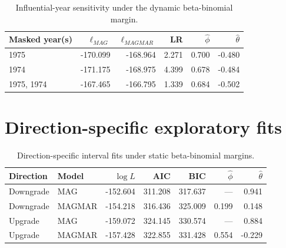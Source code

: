 \documentclass[11pt]{article}
\theoremstyle{definition}
\begin{document}
\begin{table}[H]
\centering
\caption{Influential-year sensitivity under the dynamic beta-binomial margin.}
\label{tab:influence}
\begin{tabular}{lrrrrr}
\toprule
Masked year(s) & $\ell_{MAG}$ & $\ell_{MAGMAR}$ & LR & $\widehat\phi$ & $\widehat\theta$ \\
\midrule
1975 & -170.099 & -168.964 & 2.271 & 0.700 & -0.480 \\
1974 & -171.175 & -168.975 & 4.399 & 0.678 & -0.484 \\
1975, 1974 & -167.465 & -166.795 & 1.339 & 0.684 & -0.502 \\
\bottomrule
\end{tabular}
\end{table}

\section{Direction-specific exploratory fits}
\label{app:direction}

\begin{table}[H]
\centering
\caption{Direction-specific interval fits under static beta-binomial margins.}
\label{tab:direction}
\small
\begin{tabular}{llrrrrr}
\toprule
Direction & Model & $\log L$ & AIC & BIC & $\widehat\phi$ & $\widehat\theta$ \\
\midrule
Downgrade & MAG    & -152.604 & 311.208 & 317.637 & ---   & 0.941 \\
Downgrade & MAGMAR & -154.218 & 316.436 & 325.009 & 0.199 & 0.148 \\
Upgrade   & MAG    & -159.072 & 324.145 & 330.574 & ---   & 0.884 \\
Upgrade   & MAGMAR & -157.428 & 322.855 & 331.428 & 0.554 & -0.229 \\
\bottomrule
\end{tabular}
\end{table}


\end{document}

